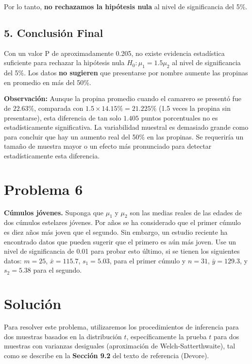 \documentclass[12pt]{article}
\begin{document}
Por lo tanto, \textbf{no rechazamos la hipótesis nula} al nivel de significancia del 5\%.

\subsection*{5. Conclusión Final}

Con un valor P de aproximadamente 0.205, no existe evidencia estadística suficiente para rechazar la hipótesis nula $H_0: \mu_1 = 1.5\mu_2$ al nivel de significancia del 5\%. Los datos \textbf{no sugieren} que presentarse por nombre aumente las propinas en promedio en más del 50\%.

\textbf{Observación:} Aunque la propina promedio cuando el camarero se presentó fue de $22.63\%$, comparada con $1.5 \times 14.15\% = 21.225\%$ (1.5 veces la propina sin presentarse), esta diferencia de tan solo $1.405$ puntos porcentuales no es estadísticamente significativa. La variabilidad muestral es demasiado grande como para concluir que hay un aumento real del 50\% en las propinas. Se requeriría un tamaño de muestra mayor o un efecto más pronunciado para detectar estadísticamente esta diferencia.

\section*{Problema 6}

\textbf{Cúmulos jóvenes.} Suponga que $\mu_1$ y $\mu_2$ son las medias reales de las edades de dos cúmulos estelares jóvenes. Por años se ha considerado que el primer cúmulo es diez años más joven que el segundo. Sin embargo, un estudio reciente ha encontrado datos que pueden sugerir que el primero es aún más joven. Use un nivel de significancia de 0.01 para probar esto último, si se tienen los siguientes datos: $m = 25$, $\bar{x} = 115.7$, $s_1 = 5.03$, para el primer cúmulo y $n = 31$, $\bar{y} = 129.3$, y $s_2 = 5.38$ para el segundo.

\section*{Solución}

Para resolver este problema, utilizaremos los procedimientos de inferencia para dos muestras basados en la distribución $t$, específicamente la prueba $t$ para dos muestras con varianzas desiguales (aproximación de Welch-Satterthwaite), tal como se describe en la \textbf{Sección 9.2} del texto de referencia (Devore).
\end{document}
